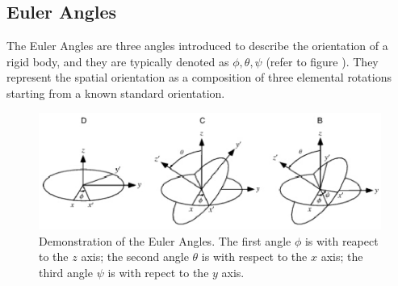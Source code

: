 \subsection*{Euler Angles}
The Euler Angles are three angles introduced to describe the orientation of 
a rigid body, and they are typically denoted as $\phi, \theta, \psi$ (refer 
to figure ). They represent the spatial orientation as 
a composition of three elemental rotations starting from a known standard 
orientation.
\begin{figure}[!ht]
\centering
\includegraphics[width=0.96\columnwidth]{figures/euler_angles}
\caption{Demonstration of the Euler Angles. The first angle $\phi$ is with 
reapect to the $z$ axis; the second angle $\theta$ is with respect to the 
$x$ axis; the third angle $\psi$ is with repect to the $y$ axis.}
\label{fig:euler_angles}
\end{figure}

